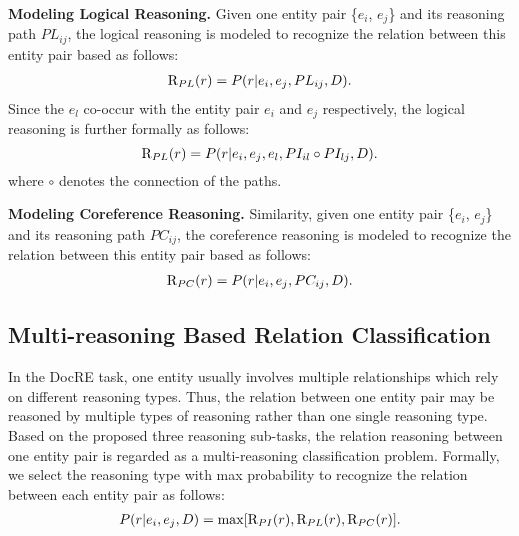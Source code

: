 \documentclass[11pt,a4paper]{article}
\begin{document}
\noindent\textbf{Modeling Logical Reasoning.}
Given one entity pair \{$e_i$, $e_j$\} and its reasoning path $PL_{ij}$, the logical reasoning is modeled to recognize the relation between this entity pair based as follows:
\begin{equation}
\begin{aligned}
\textup{R}_{PL}(r)=P(r|e_i, e_j, PL_{ij}, D).
\label{eq:reasontask2}
\end{aligned}
\end{equation}
Since the $e_l$ co-occur with the entity pair $e_i$ and $e_j$ respectively, the logical reasoning is further formally as follows:
\begin{equation}
\textup{R}_{PL}(r)=P(r|e_i, e_j, e_l, PI_{il}\circ PI_{lj}, D).
\label{eq:reasontask2decompose}
\end{equation}
where $\circ$ denotes the connection of the paths.

\noindent\textbf{Modeling Coreference Reasoning.}
Similarity, given one entity pair \{$e_i$, $e_j$\} and its reasoning path $PC_{ij}$, the coreference reasoning is modeled to recognize the relation between this entity pair based as follows:
\begin{equation}
\begin{aligned}
\textup{R}_{PC}(r)=P(r|e_i, e_j, PC_{ij}, D).
\label{eq:reasontask3}
\end{aligned}
\end{equation}

\subsection{Multi-reasoning Based Relation Classification}
\label{sec2-3}
In the DocRE task, one entity usually involves multiple relationships which rely on different reasoning types.
Thus, the relation between one entity pair may be reasoned by multiple types of reasoning rather than one single reasoning type.
Based on the proposed three reasoning sub-tasks, the relation reasoning between one entity pair is regarded as a multi-reasoning classification problem.
Formally, we select the reasoning type with max probability to recognize the relation between each entity pair as follows:
\begin{equation}
\begin{aligned}
P(r|e_i,e_j,D)=\max[\textup{R}_{PI}(r), \textup{R}_{PL}(r), \textup{R}_{PC}(r)].
\label{eq:fullprobability}
\end{aligned}
\end{equation}
\end{document}
